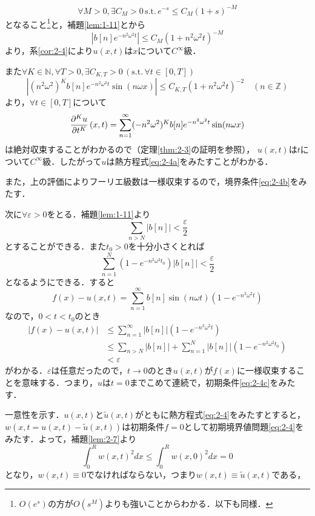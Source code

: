 \documentclass[dvipdfmx,a4j,10pt]{jsarticle}
\makeatletter
\theoremstyle{mystyle1}
\theoremstyle{mystyle3}
\theoremstyle{mystyle4}
\theoremstyle{mystyle6}
\theoremstyle{mystyle2}
\theoremstyle{mystyle5}
\renewenvironment{proof}[1][\proofname]{\par
  \pushQED{\qed}%
  \normalfont
  \topsep6\p@\@plus6\p@ \trivlist
  \item[\hskip\labelsep{\bfseries\sffamily #1}]\ignorespaces
}{%
  \popQED\endtrivlist\@endpefalse
}
\renewcommand\proofname{証明}
\makeatother
\begin{document}
\begin{proof}
	\[
		\forall M>0,\exists C_M>0\,\textrm{s.t.}\, e^{-s}\leq C_M(1+s)^{-M}
	\]
	となること\footnote{$O(e^s)$の方が$O(s^M)$よりも強いことからわかる．以下も同様．}と，補題\ref{lem:1-11}とから
	\begin{equation}\label{eq:2-7}
		|b[n]e^{-n^2\omega^2 t}|\leq C_M(1+n^2\omega^2 t)^{-M}
	\end{equation}
	より，系\ref{cor:2-4}により$u(x,t)$は$x$について$C^\infty$級．

	また$\forall K\in\mathbb{N},\forall T>0,\exists C_{K,T}>0\,(\textrm{s.t.}\, \forall t\in[0,T])$
	\[
		|(n^2 \omega^2)^K b[n]e^{-n^2\omega^2 t}\sin(n\omega x)|\leq C_{K,T}(1+n^2\omega^2 t)^{-2}\quad(n\in\mathbb{Z})
	\]
	より，$\forall t\in[0,T]$について
	\[
		\pdv[K]{u}{t}\,(x,t)=\sum_{n=1}^\infty (-n^2\omega^2)^K b[n]e^{-n^2\omega^2 t}\sin(n\omega x)
	\]
	は絶対収束することがわかるので（定理\ref{thm:2-3}の証明を参照），
	$u(x,t)$は$t$について$C^\infty$級．したがって$u$は熱方程式\eqref{eq:2-4a}をみたすことがわかる．

	また，上の評価によりフーリエ級数は一様収束するので，境界条件\eqref{eq:2-4b}をみたす．

	次に$\forall\varepsilon>0$をとる．補題\ref{lem:1-11}より
	\[
		\sum_{n>N}|b[n]|<\frac{\varepsilon}{2}
	\]
	とすることができる．また$t_0>0$を十分小さくとれば
	\[
		\sum_{n=1}^N(1-e^{-n^2\omega^2t_0})|b[n]|<\frac{\varepsilon}{2}
	\]
	となるようにできる．すると
	\[
		f(x)-u(x,t)=\sum_{n=1}^\infty b[n]\sin(n\omega t)(1-e^{-n^2\omega^2t})
	\]
	なので，$0<t<t_0$のとき
	\[
		\begin{split}
			|f(x)-u(x,t)|&\leq\sum_{n=1}^\infty |b[n]|(1-e^{-n^2\omega^2t}) \\
			&\leq \sum_{n>N}|b[n]|+\sum_{n=1}^N|b[n]|(1-e^{-n^2\omega^2t_0}) \\
			&<\varepsilon
		\end{split}
	\]
	がわかる．$\varepsilon$は任意だったので，$t\to 0$のとき$u(x,t)$が$f(x)$に一様収束することを意味する．つまり，$u$は$t=0$までこめて連続で，初期条件\eqref{eq:2-4c}をみたす．

	一意性を示す．$u(x,t)$と$\tilde u(x,t)$がともに熱方程式\eqref{eq:2-4}をみたすとすると，$w(x,t=u(x,t)-\tilde u(x,t))$は初期条件$f=0$として初期境界値問題\eqref{eq:2-4}をみたす．よって，補題\ref{lem:2-7}より
	\[
		\int_0^R w(x,t)^2dx\leq \int_0^R w(x,0)^2dx=0
	\]
	となり，$w(x,t)\equiv 0$でなければならない，つまり$w(x,t)\equiv \tilde u(x,t)$である，
\end{proof}
\end{document}
